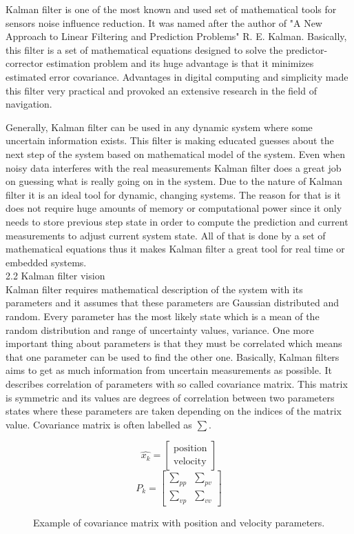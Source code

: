 \documentclass[../../main]{subfiles}
\begin{document}
Kalman filter is one of the most known and used set of mathematical tools for sensors noise influence reduction. It was named after the author of "A New Approach to Linear Filtering
and Prediction Problems" \cite{kalman1960} R. E. Kalman. Basically, this filter is a set of mathematical equations designed to solve the predictor-corrector estimation problem and its huge advantage is that it minimizes estimated error covariance. Advantages in digital computing and simplicity made this filter very practical and provoked an extensive research in the field of navigation.

Generally, Kalman filter can be used in any dynamic system where some uncertain information exists. This filter is making educated guesses about the next step of the system based on mathematical model of the system. Even when noisy data interferes with the real measurements Kalman filter does a great job on guessing what is really going on in the system.
Due to the nature of Kalman filter it is an ideal tool for dynamic, changing systems. The reason for that is it does not require huge amounts of memory or computational power since it only needs to store previous step state in order to compute the prediction and current measurements to adjust current system state. All of that is done by a set of mathematical equations thus it makes Kalman filter a great tool for real time or embedded systems. \\

2.2 Kalman filter vision \\

Kalman filter requires mathematical description of the system with its parameters and it assumes that these parameters are Gaussian distributed and random. Every parameter has the most likely state which is a mean of the random distribution and range of uncertainty values, variance. One more important thing about parameters is that they must be correlated which means that one parameter can be used to find the other one. Basically, Kalman filters aims to get as much information from uncertain measurements as possible.
It describes correlation of parameters with so called covariance matrix. This matrix is symmetric and its values are degrees of correlation between two parameters states where these parameters are taken depending on the indices of the matrix value. Covariance matrix is often labelled as $\sum$.

\begin{figure} [!ht]
  \centering    
    \begin{equation}
       \hat{x_k} = \left[ \begin{array}{c} \text{position} \\ \text{velocity} \end{array} \right]
    \end{equation}
    \begin{equation}
       P_k = \begin{bmatrix} \sum_{pp} & \sum_{pv} \\ \sum_{vp} & \sum_{vv} \end{bmatrix}
    \end{equation}
  \caption{Example of covariance matrix with position and velocity parameters.}
\end{figure}
\end{document}
